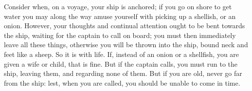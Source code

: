 Consider when, on  a voyage, your ship is  anchored; if you go on  shore to get
water you may  along the way amuse  yourself with picking up a  shellish, or an
onion. However, your thoughts and continual  attention ought to be bent towards
the ship, waiting for  the captain to call on board;  you must then immediately
leave all these things, otherwise you will  be thrown into the ship, bound neck
and  feet like  a sheep.  So it  is with  life. If,  instead of  an onion  or a
shellfish, you  are given a  wife or  child, that is  fine. But if  the captain
calls, you must run to the ship,  leaving them, and regarding none of them. But
if you  are old, never  go far from  the ship: lest,  when you are  called, you
should be unable to come in time.
